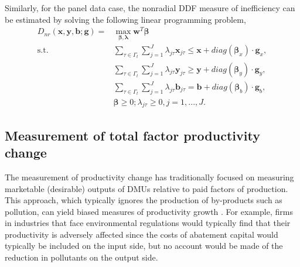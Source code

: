 Similarly, for the panel data case, the nonradial DDF measure of inefficiency can be estimated by solving the following linear programming problem,
\begin{equation}\begin{split}\label{eq_eff_nr_panel}
    D_{nr} (\pmb{x},\pmb{y},\pmb{b};\pmb{g}) 
    = &\max _{\pmb{\beta},\pmb{\lambda}} \pmb{w}^{T} \pmb{\beta}  \\ 
    \text{s.t.} &\sum\limits_{\tau \in \Gamma_t }\sum\limits_{j = 1}^J {{\lambda _{j\tau}}{{\pmb{x}}_{j\tau}} \le \pmb{x} + diag(\pmb{\beta}_x)\cdot \pmb{g}_x}, \\ 
                &\sum\limits_{\tau \in \Gamma_t }\sum\limits_{j = 1}^J {{\lambda _{j\tau}}{{\pmb{y}}_{j\tau}} \ge \pmb{y} + diag(\pmb{\beta}_y)\cdot \pmb{g}_y}, \\ 
                &\sum\limits_{\tau \in \Gamma_t }\sum\limits_{j = 1}^J {{\lambda _{j\tau}}{{\pmb{b}}_{j\tau}} = \pmb{b} + diag(\pmb{\beta}_b)\cdot \pmb{g}_b}, \\ 
                &\pmb{\beta} \ge 0; \lambda_{j\tau} \ge 0, j = 1,...,J.
\end{split}\end{equation}


\subsection{Measurement of total factor productivity change}
The measurement of productivity change has traditionally focused on measuring marketable (desirable) outputs of DMUs relative to paid factors of production. 
This approach, which typically ignores the production of by-products such as pollution, can yield biased measures of productivity growth \citep{Chung1997}. 
For example, firms in industries that face environmental regulations would typically find that their productivity is adversely affected since the costs of abatement capital would typically be included on the input side, but no account would be made of the reduction in pollutants on the output side.

